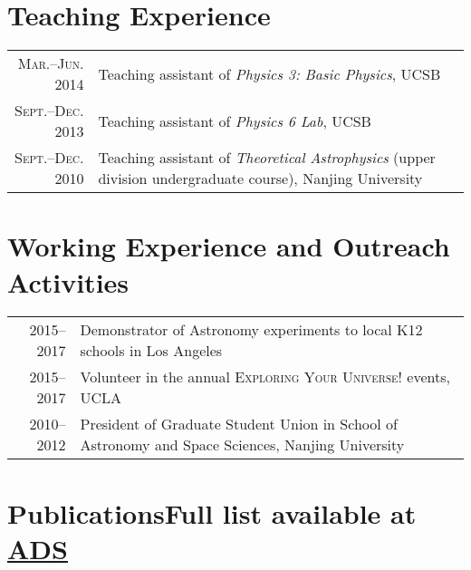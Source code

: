\documentclass[letterpaper,12pt]{article}
\begin{document}
\section{Teaching Experience}

\begin{tabular}{rp{5in}}
\textsc{\small Mar.--Jun. 2014}  & Teaching assistant of \textit{Physics 3: Basic Physics}, UCSB \\
\textsc{\small Sept.--Dec. 2013}  & Teaching assistant of \textit{Physics 6 Lab}, UCSB \\
\textsc{\small Sept.--Dec. 2010}  & Teaching assistant of \textit{Theoretical Astrophysics} (upper division undergraduate course), Nanjing University
\end{tabular}

\section{Working Experience and Outreach Activities}

\begin{tabular}{rp{5.4in}}
\textsc{2015--2017}  & Demonstrator of Astronomy experiments to local K12 schools in Los Angeles    \\
\textsc{2015--2017}  & Volunteer in the annual \textsc{Exploring Your Universe!} events, UCLA \\
\textsc{2010--2012}  & President of Graduate Student Union in School of Astronomy and Space Sciences, Nanjing University
\end{tabular}


\clearpage
\section{Publications\hfill Full list available at \href{https://ui.adsabs.harvard.edu/public-libraries/D2s74Q15TomjQ7uGtxK5gQ}{ADS}}
\end{document}
